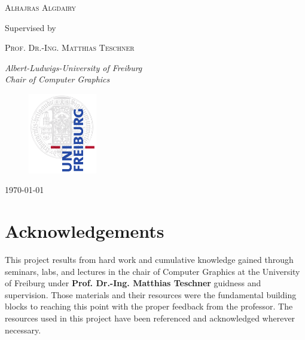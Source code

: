 \documentclass[11pt,a4paper]{article}
\begin{document}
\begin{titlepage}
	{\scshape\Large Alhajras Algdairy \\} %
	
			\vspace{0.5\baselineskip} %

	Supervised by
	
	\vspace{0.5\baselineskip} %
	
	{\scshape\Large Prof. Dr.-Ing. Matthias Teschner\\} %

	\vspace{0.5\baselineskip} %
		
	\textit{Albert-Ludwigs-University of Freiburg \\ Chair of Computer Graphics} %
	
		
\begin{figure}[h]	
     \centering
         \includegraphics[width=3cm]{images/freiburg.png}
\end{figure}
	\vfill %
	
	


	
	\vspace{0.3\baselineskip} %
	
	\today%
	

\end{titlepage}

\clearpage

\section*{Acknowledgements}
This project results from hard work and cumulative knowledge gained through seminars, labs, and lectures in the chair of Computer Graphics at the University of Freiburg under \textbf{Prof. Dr.-Ing. Matthias Teschner} guidness and supervision. Those materials and their resources were the fundamental building blocks to reaching this point with the proper feedback from the professor. The resources used in this project have been referenced and acknowledged wherever necessary.
\\
\end{document}
